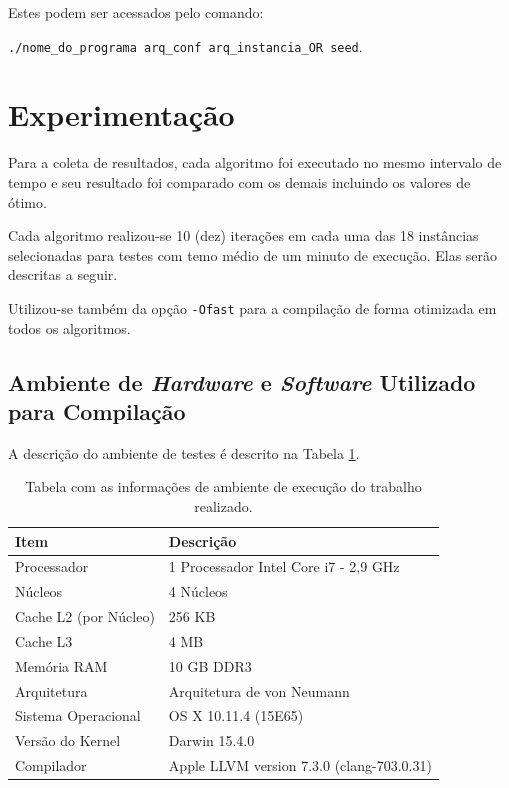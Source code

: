 \documentclass[portugues, brazil, a4paper,12pt]{article}
\begin{document}
	Estes podem ser acessados pelo comando:
	
	\verb|./nome_do_programa arq_conf arq_instancia_OR seed|.



	
\section{Experimentação} \label{sec:exec}
	Para a coleta de resultados, cada algoritmo foi executado no mesmo intervalo de tempo e seu resultado foi comparado com os demais incluindo os valores de ótimo.

	Cada algoritmo realizou-se 10 (dez) iterações em cada uma das 18 instâncias selecionadas para testes com temo médio de um minuto de execução. Elas serão descritas a seguir.

	Utilizou-se também da opção \verb|-Ofast| para a compilação de forma otimizada em todos os algoritmos.
	
	
	\subsection{Ambiente de \textit{Hardware} e \textit{Software} Utilizado para Compilação}
		A descrição do ambiente de testes é descrito na Tabela \ref{tab:arq}.
		
		\begin{table}[H]
			\caption{Tabela com as informações de ambiente de execução do trabalho realizado.}
			\centering \label{tab:arq}
			\begin{tabular}{l|l}
				\hline
				\textbf{Item}                & \textbf{Descrição} \\ \hline \hline
				Processador         & 1 Processador Intel Core i7 - 2,9 GHz         \\
				Núcleos             & 4 Núcleos \\
				Cache L2 (por Núcleo) & 256 KB \\
				Cache L3            & 4 MB \\
				Memória RAM         & 10 GB DDR3        \\
				Arquitetura         & Arquitetura de von Neumann         \\
				Sistema Operacional & OS X 10.11.4 (15E65)         \\
				Versão do Kernel    & Darwin 15.4.0 \\
				Compilador          & Apple LLVM version 7.3.0 (clang-703.0.31)         \\\hline
			\end{tabular}
		\end{table}
	
\end{document}
